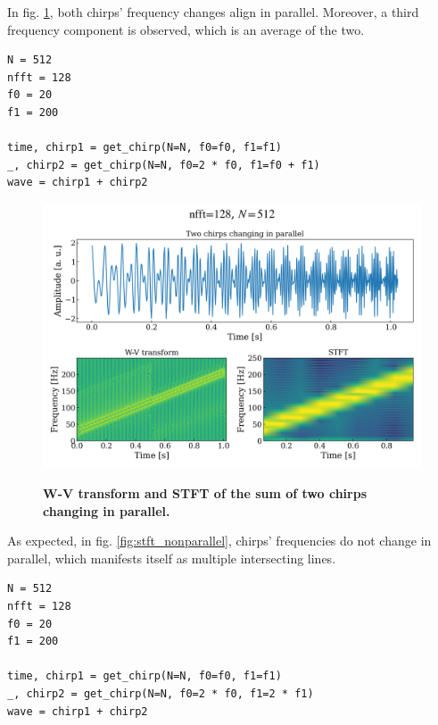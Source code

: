 \documentclass[13pt,a4paper]{article}
\begin{document}
In fig. \ref{fig:stft_parallel}, both chirps' frequency changes align in parallel. Moreover, a third frequency component is observed, which is an average of the two.

\begin{lstlisting}[caption={\textbf{Snippet for calculating the spectrum of the sum of two chirps changing in parallel.}}]
N = 512
nfft = 128
f0 = 20
f1 = 200

time, chirp1 = get_chirp(N=N, f0=f0, f1=f1)
_, chirp2 = get_chirp(N=N, f0=2 * f0, f1=f0 + f1)
wave = chirp1 + chirp2
\end{lstlisting}

\begin{figure}[ht!]
    \centering
    \caption{\textbf{W-V transform and STFT of the sum of two chirps changing in parallel.}}
    \includegraphics[width=\linewidth]{stft_parallel.png}
    \label{fig:stft_parallel}
\end{figure}
\pagebreak


As expected, in fig. \ref{fig:stft_nonparallel}, chirps' frequencies do not change in parallel, which manifests itself as multiple intersecting lines.

\begin{lstlisting}[caption={\textbf{Snippet for calculating the spectrum of the sum of two chirps changing in parallel.}}]
N = 512
nfft = 128
f0 = 20
f1 = 200

time, chirp1 = get_chirp(N=N, f0=f0, f1=f1)
_, chirp2 = get_chirp(N=N, f0=2 * f0, f1=2 * f1)
wave = chirp1 + chirp2
\end{lstlisting}
\end{document}
